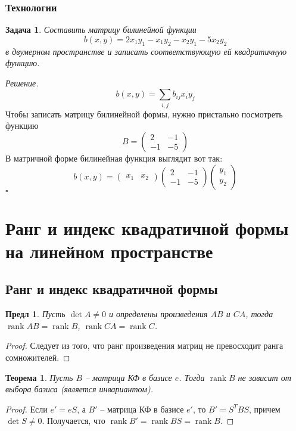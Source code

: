 \documentclass[a4paper,12pt]{article}
\DeclareMathOperator{\rank}{\mathop{rank}}
\newtheorem{theorem}{Теорема}[section]
\newtheorem{propos}{Предл}[section]
\newtheorem*{prob}{Задача}
\newenvironment{soln}{\noindent\textit{Решение.}}{\hfill$\square$}
\begin{document}
\subsubsection{Технологии}

\begin{prob}
	Составить матрицу билинейной функции 
	\[
		b(x,y) = 2 x_1 y_1 - x_1 y_2 - x_2 y_1 - 5 x_2 y_2
	\]
	 в двумерном пространстве и записать соответствующую ей квадратичную функцию.
\end{prob}
\begin{soln}
	\[
		b(x,y) = \sum_{i,j}b_{ij}x_i y_j
	\]
	Чтобы записать матрицу билинейной формы, нужно пристально посмотреть функцию
	\[
		B = \begin{pmatrix}
			2 & -1 \\
			-1 & -5 
		\end{pmatrix}
	\]
	В матричной форме билинейная функция выглядит вот так:
	\[
		b(x,y) = \begin{pmatrix}
			x_1 & x_2 			
		\end{pmatrix} 
		\begin{pmatrix}
			2 & -1 \\
			-1 & -5 
		\end{pmatrix}
		\begin{pmatrix}
			y_1 \\
			y_2 			
		\end{pmatrix} 
	\]
\end{soln}



\section{Ранг и индекс квадратичной формы на линейном пространстве}
\subsection{Ранг и индекс квадратичной формы}

\begin{propos}
	Пусть $\det A \ne 0$ и определены произведения $AB$ и $CA$, тогда $\rank AB = \rank B$, $\rank CA = \rank C$.
\end{propos}
\begin{proof}
	Следует из того, что ранг произведения матриц не превосходит ранга сомножителей.
\end{proof}

\begin{theorem}
	Пусть $B$ -- матрица КФ в базисе $e$. Тогда $\rank B$ не зависит от выбора базиса (является инвариантом).
\end{theorem}
\begin{proof}
	Если $e' = eS$, а $B'$ -- матрица КФ в базисе $e'$, то $B' = S^T B S$, причем  $\det S \ne 0$. Получается, что $\rank B' = \rank B S = \rank B$.
\end{proof}
\end{document}
